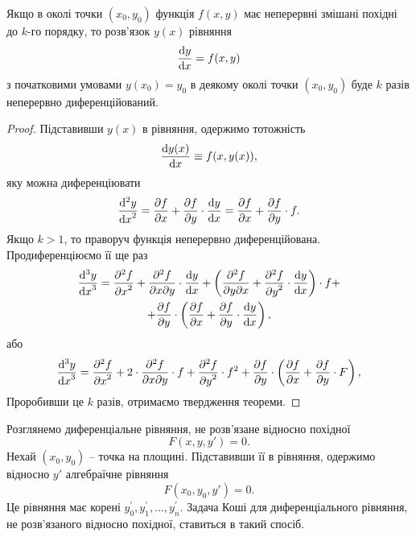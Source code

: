 \begin{theorem}
	Якщо в околі точки $(x_0,y_0)$ функція $f(x,y)$ має неперервні змішані похідні до $k$-го порядку, то розв’язок $y(x)$ рівняння
	\begin{equation*}
		\frac{\mathop{}\!\mathrm{d} y}{\mathop{}\!\mathrm{d} x} = f(x, y)
	\end{equation*}
	з початковими умовами $y(x_0)=y_0$ в деякому околі точки $(x_0,y_0)$ буде $k$ разів неперервно диференційований.
\end{theorem}
\begin{proof} 
	Підставивши $y(x)$ в рівняння, одержимо тотожність
	\begin{equation*}
		\frac{\mathop{}\!\mathrm{d} y(x)}{\mathop{}\!\mathrm{d} x} \equiv f(x, y(x)),
	\end{equation*}
	яку можна диференціювати
	\begin{equation*}
		\frac{\mathop{}\!\mathrm{d}^2 y}{{\mathop{}\!\mathrm{d} x}^2} = \frac{\partial f}{\partial x} + \frac{\partial f}{\partial y} \cdot \frac{\mathop{}\!\mathrm{d} y}{\mathop{}\!\mathrm{d} x} = \frac{\partial f}{\partial x} + \frac{\partial f}{\partial y} \cdot f.
	\end{equation*}
	Якщо $k > 1$, то праворуч функція неперервно диференційована. Продиференціюємо її ще раз
	\begin{multline}
		\frac{\diff^3 y}{{\diff x}^3} = \frac{\partial^2 f}{{\partial x}^2} + \frac{\partial^2 f}{\partial x \partial y} \cdot \frac{\diff y}{\diff x} + \left( \frac{\partial^2 f}{\partial y \partial x} + \frac{\partial^2 f}{{\partial y}^2} \cdot \frac{\diff y}{\diff x} \right) \cdot f + \\
		+ \frac{\partial f}{\partial y} \cdot \left( \frac{\partial f}{\partial x} + \frac{\partial f}{\partial y} \cdot \frac{\diff y}{\diff x} \right),
	\end{multline}
	або
	\begin{equation*}
		\frac{\mathop{}\!\mathrm{d}^3 y}{{\mathop{}\!\mathrm{d} x}^3} = \frac{\partial^2 f}{{\partial x}^2} + 2 \cdot \frac{\partial^2 f}{\partial x \partial y} \cdot f + \frac{\partial^2 f}{{\partial y}^2} \cdot f^2 + \frac{\partial f}{\partial y} \cdot \left( \frac{\partial f}{\partial x} + \frac{\partial f}{\partial y} \cdot F \right),
	\end{equation*}
	Проробивши це $k$ разів, отримаємо твердження теореми.
\end{proof}

Розглянемо диференціальне рівняння, не розв’язане відносно похідної
\begin{equation*}
	F(x, y, y') = 0.
\end{equation*}
Нехай $(x_0, y_0)$ -- точка на площині. Підставивши її в рівняння, одержимо відносно $y'$ алгебраїчне рівняння
\begin{equation*}
	F(x_0, y_0, y') = 0.
\end{equation*}
Це рівняння має корені $y_0^\prime, y_1^\prime, \ldots, y_n^\prime$. Задача Коші для диференціального рівняння, не розв’язаного відносно похідної, ставиться в такий спосіб. \\

